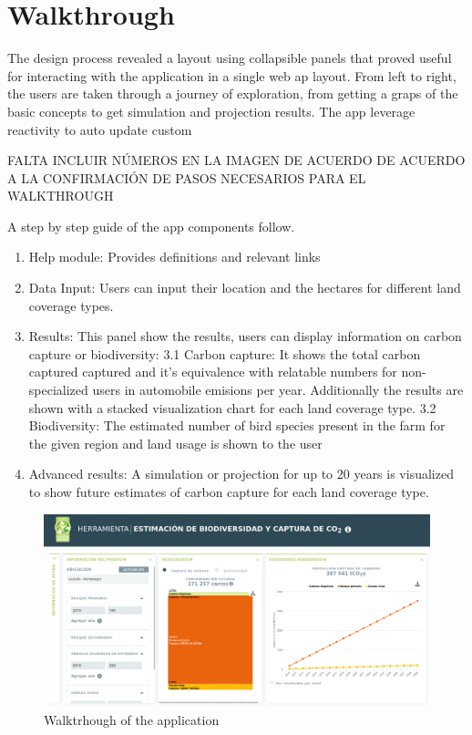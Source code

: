 \documentclass[
]{jss}
\providecommand{\tightlist}{%
  \setlength{\itemsep}{0pt}\setlength{\parskip}{0pt}}
\begin{document}
\hypertarget{walkthrough}{%
\section{Walkthrough}\label{walkthrough}}

The design process revealed a layout using collapsible panels that
proved useful for interacting with the application in a single web ap
layout. From left to right, the users are taken through a journey of
exploration, from getting a graps of the basic concepts to get
simulation and projection results. The app leverage reactivity to auto
update custom

FALTA INCLUIR NÚMEROS EN LA IMAGEN DE ACUERDO DE ACUERDO A LA
CONFIRMACIÓN DE PASOS NECESARIOS PARA EL WALKTHROUGH

A step by step guide of the app components follow.

\begin{enumerate}
\def\labelenumi{\arabic{enumi}.}
\tightlist
\item
  Help module: Provides definitions and relevant links
\item
  Data Input: Users can input their location and the hectares for
  different land coverage types.
\item
  Results: This panel show the results, users can display information on
  carbon capture or biodiversity: 3.1 Carbon capture: It shows the total
  carbon captured captured and it's equivalence with relatable numbers
  for non-specialized users in automobile emisions per year.
  Additionally the results are shown with a stacked visualization chart
  for each land coverage type. 3.2 Biodiversity: The estimated number of
  bird species present in the farm for the given region and land usage
  is shown to the user
\item
  Advanced results: A simulation or projection for up to 20 years is
  visualized to show future estimates of carbon capture for each land
  coverage type.
\end{enumerate}

\begin{figure}
\centering
\includegraphics{figures/app.png}
\caption{Walktrhough of the application}
\end{figure}
\end{document}
